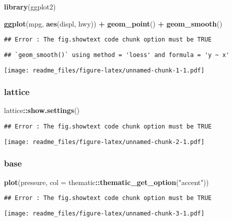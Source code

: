\documentclass[
]{article}
\newenvironment{Shaded}{\begin{snugshade}}{\end{snugshade}}
\newcommand{\AttributeTok}[1]{\textcolor[rgb]{0.13,0.29,0.53}{#1}}
\newcommand{\FunctionTok}[1]{\textcolor[rgb]{0.13,0.29,0.53}{\textbf{#1}}}
\newcommand{\NormalTok}[1]{#1}
\newcommand{\SpecialCharTok}[1]{\textcolor[rgb]{0.81,0.36,0.00}{\textbf{#1}}}
\newcommand{\StringTok}[1]{\textcolor[rgb]{0.31,0.60,0.02}{#1}}
\begin{document}
\begin{Shaded}
\begin{Highlighting}[]
\FunctionTok{library}\NormalTok{(ggplot2)}

\FunctionTok{ggplot}\NormalTok{(mpg, }\FunctionTok{aes}\NormalTok{(displ, hwy)) }\SpecialCharTok{+}
  \FunctionTok{geom\_point}\NormalTok{() }\SpecialCharTok{+} \FunctionTok{geom\_smooth}\NormalTok{()}
\end{Highlighting}
\end{Shaded}

\begin{verbatim}
## Error : The fig.showtext code chunk option must be TRUE
\end{verbatim}

\begin{verbatim}
## `geom_smooth()` using method = 'loess' and formula = 'y ~ x'
\end{verbatim}

\texttt{[image: readme\_files/figure-latex/unnamed-chunk-1-1.pdf]}

\hypertarget{lattice}{%
\subsubsection{lattice}\label{lattice}}

\begin{Shaded}
\begin{Highlighting}[]
\NormalTok{lattice}\SpecialCharTok{::}\FunctionTok{show.settings}\NormalTok{()}
\end{Highlighting}
\end{Shaded}

\begin{verbatim}
## Error : The fig.showtext code chunk option must be TRUE
\end{verbatim}

\texttt{[image: readme\_files/figure-latex/unnamed-chunk-2-1.pdf]}

\hypertarget{base}{%
\subsubsection{base}\label{base}}

\begin{Shaded}
\begin{Highlighting}[]
\FunctionTok{plot}\NormalTok{(pressure, }\AttributeTok{col =}\NormalTok{ thematic}\SpecialCharTok{::}\FunctionTok{thematic\_get\_option}\NormalTok{(}\StringTok{"accent"}\NormalTok{))}
\end{Highlighting}
\end{Shaded}

\begin{verbatim}
## Error : The fig.showtext code chunk option must be TRUE
\end{verbatim}

\texttt{[image: readme\_files/figure-latex/unnamed-chunk-3-1.pdf]}
\end{document}
